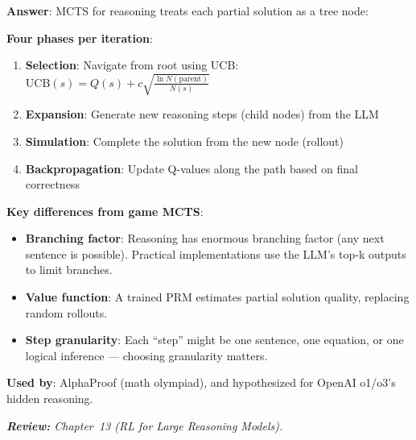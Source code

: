 \begin{questionbox}
\textbf{Answer}: MCTS for reasoning treats each partial solution as a tree node:

\textbf{Four phases per iteration}:

\begin{enumerate}
  \item \textbf{Selection}: Navigate from root using UCB: $\text{UCB}(s) = Q(s) + c\sqrt{\frac{\ln N(\text{parent})}{N(s)}}$
  \item \textbf{Expansion}: Generate new reasoning steps (child nodes) from the LLM
  \item \textbf{Simulation}: Complete the solution from the new node (rollout)
  \item \textbf{Backpropagation}: Update Q-values along the path based on final correctness
\end{enumerate}

\textbf{Key differences from game MCTS}:

\begin{itemize}
  \item \textbf{Branching factor}: Reasoning has enormous branching factor (any next sentence is possible). Practical implementations use the LLM’s top-k outputs to limit branches.
  \item \textbf{Value function}: A trained PRM estimates partial solution quality, replacing random rollouts.
  \item \textbf{Step granularity}: Each ``step'' might be one sentence, one equation, or one logical inference --- choosing granularity matters.
\end{itemize}

\textbf{Used by}: AlphaProof (math olympiad), and hypothesized for OpenAI o1/o3’s hidden reasoning.

\emph{\textbf{Review:} Chapter~13 (RL for Large Reasoning Models).}
\end{questionbox}

